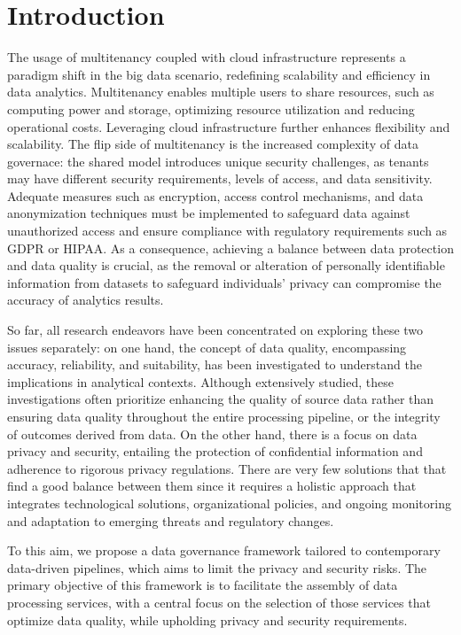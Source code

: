 \section{Introduction}
The usage of multitenancy coupled with cloud infrastructure represents a paradigm shift in the big data scenario, redefining scalability and efficiency in data analytics. Multitenancy enables multiple users to share resources, such as computing power and storage, optimizing resource utilization and reducing operational costs. Leveraging cloud infrastructure further enhances flexibility and scalability.
%
The flip side of multitenancy is the increased complexity of data governace: the shared model introduces unique security challenges, as tenants may have different security requirements, levels of access, and data sensitivity. Adequate measures such as encryption, access control mechanisms, and data anonymization techniques must be implemented to safeguard data against unauthorized access and ensure compliance with regulatory requirements such as GDPR or HIPAA.
%
As a consequence, achieving a balance between data protection and data quality is crucial, as the removal or alteration of personally identifiable information from datasets to safeguard individuals' privacy can compromise the accuracy of analytics results.

So far, all research endeavors have been concentrated on exploring these two issues separately: on one hand, the concept of data quality, encompassing accuracy, reliability, and suitability, has been investigated to understand the implications in analytical contexts. Although extensively studied, these investigations often prioritize enhancing the quality of source data rather than ensuring data quality throughout the entire processing pipeline, or the integrity of outcomes derived from data. On the other hand, there is a focus on data privacy and security, entailing the protection of confidential information and adherence to rigorous privacy regulations.
There are very few solutions that  that find a good balance between them since it requires a holistic approach that integrates technological solutions, organizational policies, and ongoing monitoring and adaptation to emerging threats and regulatory changes.

To this aim, we propose a data governance framework tailored to contemporary data-driven pipelines, which aims to limit the privacy and security risks. The primary objective of this framework is to facilitate the assembly of data processing services, with a central focus on the selection of those services that optimize data quality, while upholding privacy and security requirements.

